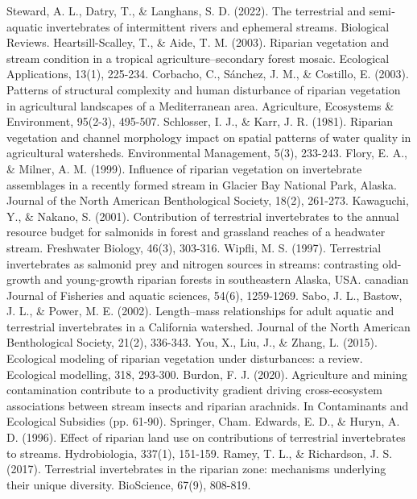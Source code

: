 \documentclass[12pt]{article}
\numberwithin{equation}{section}
\begin{document}
\begin{thebibliography}{99}
  Steward, A. L., Datry, T., \& Langhans, S. D. (2022). The terrestrial and semi‐aquatic invertebrates of intermittent rivers and ephemeral streams. Biological Reviews.
  Heartsill-Scalley, T., \& Aide, T. M. (2003). Riparian vegetation and stream condition in a tropical agriculture–secondary forest mosaic. Ecological Applications, 13(1), 225-234.
  Corbacho, C., Sánchez, J. M., \& Costillo, E. (2003). Patterns of structural complexity and human disturbance of riparian vegetation in agricultural landscapes of a Mediterranean area. Agriculture, Ecosystems \& Environment, 95(2-3), 495-507.
  Schlosser, I. J., \& Karr, J. R. (1981). Riparian vegetation and channel morphology impact on spatial patterns of water quality in agricultural watersheds. Environmental Management, 5(3), 233-243.
Flory, E. A., \& Milner, A. M. (1999). Influence of riparian vegetation on invertebrate assemblages in a recently formed stream in Glacier Bay National Park, Alaska. Journal of the North American Benthological Society, 18(2), 261-273.
  Kawaguchi, Y., \& Nakano, S. (2001). Contribution of terrestrial invertebrates to the annual resource budget for salmonids in forest and grassland reaches of a headwater stream. Freshwater Biology, 46(3), 303-316.
  Wipfli, M. S. (1997). Terrestrial invertebrates as salmonid prey and nitrogen sources in streams: contrasting old-growth and young-growth riparian forests in southeastern Alaska, USA. canadian Journal of Fisheries and aquatic sciences, 54(6), 1259-1269.
  Sabo, J. L., Bastow, J. L., \& Power, M. E. (2002). Length–mass relationships for adult aquatic and terrestrial invertebrates in a California watershed. Journal of the North American Benthological Society, 21(2), 336-343.
  You, X., Liu, J., \& Zhang, L. (2015). Ecological modeling of riparian vegetation under disturbances: a review. Ecological modelling, 318, 293-300.
  Burdon, F. J. (2020). Agriculture and mining contamination contribute to a productivity gradient driving cross-ecosystem associations between stream insects and riparian arachnids. In Contaminants and Ecological Subsidies (pp. 61-90). Springer, Cham.
  Edwards, E. D., \& Huryn, A. D. (1996). Effect of riparian land use on contributions of terrestrial invertebrates to streams. Hydrobiologia, 337(1), 151-159.
  Ramey, T. L., \& Richardson, J. S. (2017). Terrestrial invertebrates in the riparian zone: mechanisms underlying their unique diversity. BioScience, 67(9), 808-819.

\end{thebibliography}
\end{document}
